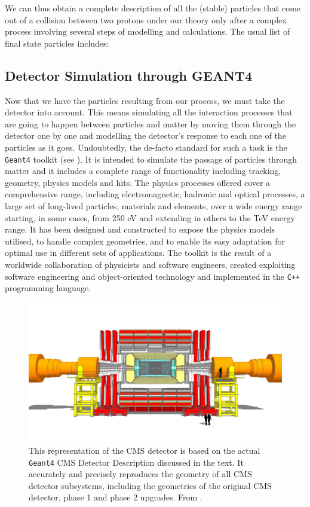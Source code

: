 We can thus obtain a complete description of all the (stable) particles that come out of a collision between two protons under our theory only after a complex process involving several steps of modelling and calculations. The usual list of final state particles includes:


\subsection{Detector Simulation through GEANT4}

Now that we have the particles resulting from our process, we must take the detector into account. This means simulating all the interaction processes that are going to happen between particles and matter by moving them through the detector one by one and modelling the detector’s response to each one of the particles as it goes. 
Undoubtedly, the de-facto standard for such a task is the \texttt{Geant4} toolkit (see \cite{AGOSTINELLI2003250}). It is intended to simulate the passage of particles through matter and it includes a complete range of functionality including tracking, geometry, physics models and hits. The physics processes offered cover a comprehensive range, including electromagnetic, hadronic and optical processes, a large set of long-lived particles, materials and elements, over a wide energy range starting, in some cases, from 250 eV and extending in others to the TeV energy range. It has been designed and constructed to expose the physics models utilised, to handle complex geometries, and to enable its easy adaptation for optimal use in different sets of applications. The toolkit is the result of a worldwide collaboration of physicists and software engineers, created exploiting software engineering and object-oriented technology and implemented in the \texttt{C++} programming language.

\begin{figure}
    \centering
     \includegraphics[width=\columnwidth]{gfx/ch2/cms_160518_01_Scene_2.png}
    \caption[CMS model]{ This representation of the CMS detector is based on the actual \texttt{Geant4} CMS Detector Description discussed in the text. It accurately and precisely reproduces the geometry of all CMS detector subsystems, including the geometries of the original CMS detector, phase 1 and phase 2 upgrades.  From \cite{decmod}.}
    \label{fig:decmod}
\end{figure}


